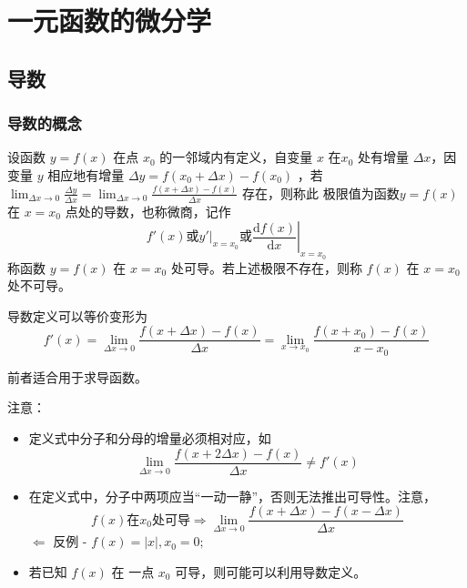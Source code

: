 \chapter{一元函数的微分学}

\section{导数}

\subsection{导数的概念}

\begin{Def}[导数]

    设函数 $ y=f(x) $ 在点 $ x_{0} $ 的一邻域内有定义，自变量 $ x $ 在$ x_0 $ 处有增量 $ \Delta x $，因变量 $ y $ 
    相应地有增量 $ \Delta y=f(x_0+\Delta x)-f(x_0) $ ，若 
    $ {\displaystyle\lim_{\Delta x\rightarrow 0}}\frac{\Delta y}{\Delta x}=
    {\displaystyle\lim_{\Delta x\rightarrow 0}}\frac{f(x+\Delta x)-f(x)}{\Delta x} $ 存在，则称此
    极限值为函数$ y=f(x) $ 在 $ x=x_0 $ 点处的导数，也称微商，记作$$
        f'(x)\textrm{或}\left.y'\right|_{x=x_0}\textrm{或}\left.\frac{\mathrm{d}f(x)}{\mathrm{d}x}\right|_{x=x_0}
    $$ 
    称函数 $ y=f(x) $ 在 $ x=x_0 $ 处可导。若上述极限不存在，则称 $ f(x) $ 在 $ x=x_0 $ 处不可导。 
\end{Def}

\begin{Field}[导数定义的等价变形]

    导数定义可以等价变形为
    $$
        f'(x)={\displaystyle\lim_{\Delta x\rightarrow 0}}\frac{f(x+\Delta x)-f(x)}{\Delta x}=
        {\displaystyle\lim_{x\rightarrow x_0}} \frac{f(x+x_0)-f(x)}{x-x_0}
    $$ 
\end{Field}
前者适合用于求导函数。

注意：
\begin{itemize}
    \item 定义式中分子和分母的增量必须相对应，如$$
        {\displaystyle\lim_{\Delta x\rightarrow 0}\frac{f(x+2\Delta x)-f(x)}{\Delta x}}\neq f'(x)
    $$ 
    \item 在定义式中，分子中两项应当“一动一静”，否则无法推出可导性。注意，$$
        f(x)\textrm{在}x_0\textrm{处可导}\Rightarrow 
        {\displaystyle\lim_{\Delta x\rightarrow 0}}\frac{f(x+\Delta x)-f(x-\Delta x)}{\Delta x}
    $$ 
    $ \Leftarrow $ 反例 - $ f(x)=|x|, x_0 = 0; $ 
    \item 若已知 $ f(x) $ 在 一点 $ x_0 $ 可导，则可能可以利用导数定义。
\end{itemize}

